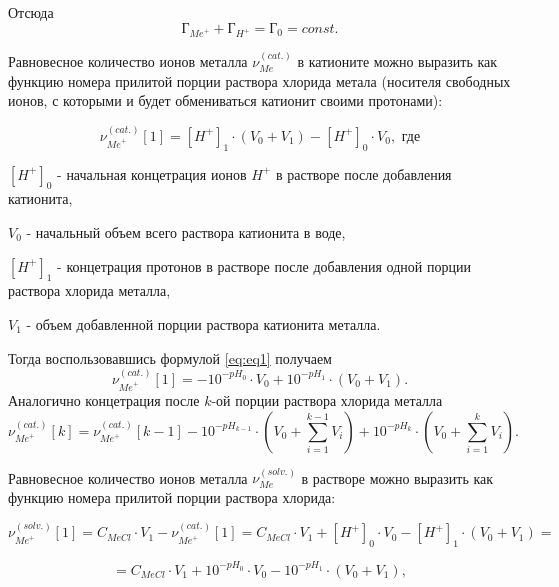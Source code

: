 \documentclass[a4paper,12pt]{article} %
\begin{document}
Отсюда
\begin{equation}
    \textit{Г}_{{Me}^{+}} + \textit{Г}_{{H}^{+}} = \textit{Г}_0 = const.
\end{equation}


Равновесное количество ионов металла $\nu_{Me}^{(cat.)}$ в катионите можно выразить как функцию номера прилитой порции раствора хлорида метала (носителя свободных ионов, с которыми и будет обмениваться катионит своими протонами):

\begin{equation}
    \nu_{{Me}^+}^{(cat.)} [1] = [H^{+}]_1 \cdot (V_0 + V_1) -[H^{+}]_0 \cdot V_0, \textrm{ где}
\end{equation}

\hspace{1 cm}$[H^{+}]_0$ - начальная концетрация ионов $H^{+}$ в растворе после добавления катионита,

\hspace{1 cm}$V_0$ - начальный объем всего раствора катионита в воде,

\hspace{1 cm}$[H^{+}]_1$ - концетрация протонов в растворе после добавления одной порции раствора хлорида металла,

\hspace{1 cm}$V_1$ - объем добавленной порции раствора катионита металла.

Тогда воспользовавшись формулой \eqref{eq:eq1} получаем
\begin{equation}
  \nu_{{Me}^+}^{(cat.)} [1] = -10^{-pH_0} \cdot V_0 + 10^{-pH_1} \cdot (V_0 + V_1).
\end{equation}
Аналогично концетрация после $k$-ой порции раствора хлорида металла
\begin{equation}
    \nu_{{Me}^+}^{(cat.)} [k] =\nu_{{Me}^+}^{(cat.)}[k-1] -10^{-pH_{k-1}} \cdot (V_0 + \sum_{i=1}^{k-1}V_i) + 10^{-pH_k} \cdot (V_0 + \sum_{i=1}^{k}V_i).
\end{equation}

Равновесное количество ионов металла $\nu_{Me}^{(solv.)}$ в растворе можно выразить как функцию номера прилитой порции раствора хлорида:

\begin{equation}
    \nu_{{Me}^+}^{(solv.)} [1] = C_{MeCl} \cdot V_1 - \nu_{{Me}^+}^{(cat.)} [1] =  C_{MeCl} \cdot V_1 + [H^{+}]_0 \cdot V_0 - [H^{+}]_1 \cdot (V_0 + V_1) =
\end{equation}


\begin{equation}
      = C_{MeCl} \cdot V_1 + 10^{-pH_0} \cdot V_0 - 10^{-pH_1} \cdot (V_0 + V_1),
\end{equation}
\end{document}
